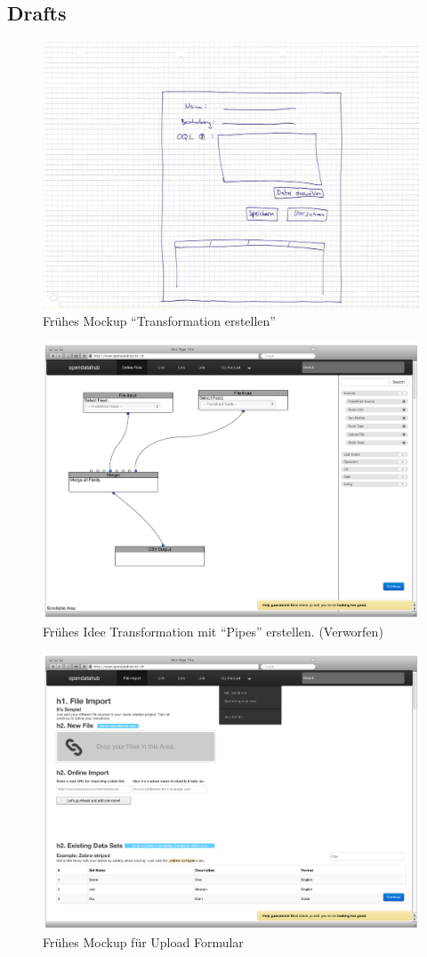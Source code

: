 \subsection{Drafts}
\begin{figure}[H]
    \centering
    \includegraphics[width=0.6\linewidth]{fig/mockup_hcdi}
    \caption{Frühes Mockup ``Transformation erstellen''}
    \label{fig:pd:mockup-upload}
\end{figure}
\begin{figure}[H]
    \centering
    \includegraphics[width=0.8\linewidth]{fig/Wireframes-Connectors}
    \caption{Frühes Idee Transformation mit ``Pipes'' erstellen. (Verworfen)}
    \label{fig:pd:connectors}
\end{figure}
\begin{figure}[H]
    \centering
    \includegraphics[width=0.8\linewidth]{fig/Wireframes-Upload}
    \caption{Frühes Mockup für Upload Formular}
    \label{fig:pd:wireframe-upload}
\end{figure}
